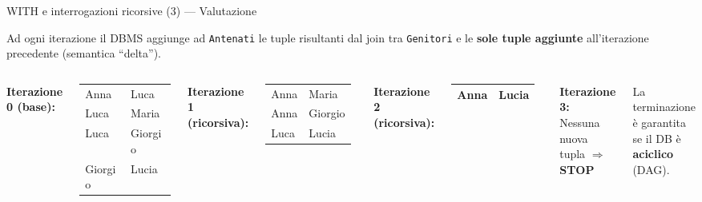 \documentclass[aspectratio=169]{beamer}
\begin{document}
\begin{frame}[fragile]{WITH e interrogazioni ricorsive (3) — Valutazione}

Ad ogni iterazione il DBMS aggiunge ad \texttt{Antenati} le tuple risultanti dal join tra \texttt{Genitori} e le \textbf{sole tuple aggiunte} all'iterazione precedente (semantica ``delta'').

\vspace{8pt}
\begin{columns}[T]
\textbf{Iterazione 0 (base):}\\[4pt]
\small
\begin{tabular}{|l|l|}
\hline
Anna & Luca \\ Luca & Maria \\ Luca & Giorgio \\ Giorgio & Lucia \\
\hline
\end{tabular}

\vspace{8pt}
\textbf{Iterazione 1 (ricorsiva):}\\[4pt]
\small
\begin{tabular}{|l|l|}
\hline
Anna & Maria \\ Anna & Giorgio \\ Luca & Lucia \\
\hline
\end{tabular}

\textbf{Iterazione 2 (ricorsiva):}\\[4pt]
\small
\begin{tabular}{|l|l|}
\hline
Anna & Lucia \\
\hline
\end{tabular}

\vspace{8pt}
\textbf{Iterazione 3:}\\[4pt]
\small Nessuna nuova tupla $\Rightarrow$ \textbf{STOP}

\vspace{8pt}
\begin{block}{}
La terminazione è garantita se il DB è \textbf{aciclico} (DAG).
\end{block}
\end{columns}

\end{frame}
\end{document}
